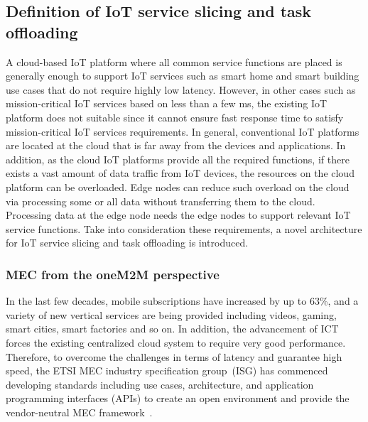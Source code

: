 \subsection{Definition of IoT service slicing and task offloading}
A cloud-based IoT platform where all common service functions are placed is generally enough to support IoT services such as smart home and smart building use cases that do not require highly low latency. However, in other cases such as mission-critical IoT services based on less than a few ms, the existing IoT platform does not suitable since it cannot ensure fast response time to satisfy mission-critical IoT services requirements. 
In general, conventional IoT platforms are located at the cloud that is far away from the devices and applications. In addition, as the cloud IoT platforms provide all the required functions, if there exists a vast amount of data traffic from IoT devices, the resources on the cloud platform can be overloaded. Edge nodes can reduce such overload on the cloud via processing some or all data without transferring them to the cloud. Processing data at the edge node needs the edge nodes to support relevant IoT service functions. Take into consideration these requirements, a novel architecture for IoT service slicing and task offloading is introduced.

\subsubsection{MEC from the oneM2M perspective}
In the last few decades, mobile subscriptions have increased by up to 63\%, and a variety of new vertical services are being provided including videos, gaming, smart cities, smart factories and so on. In addition, the advancement of ICT forces the existing centralized cloud system to require very good performance. Therefore, to overcome the challenges in terms of latency and guarantee high speed, the ETSI MEC industry specification group~(ISG) has commenced developing standards including use cases, architecture, and application programming interfaces (APIs) to create an open environment and provide the vendor-neutral MEC framework~\cite{sabella2016mobile, taleb2017multi}.

